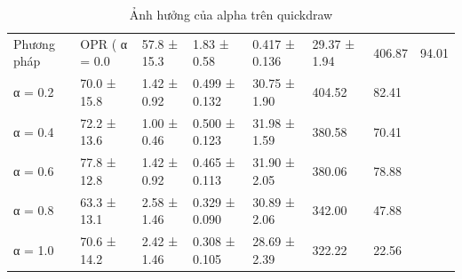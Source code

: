 \begin{table}
\caption{Ảnh hưởng của alpha trên quickdraw}
\begin{tabular}{lllllll}
\toprule
Phương pháp & OPR (%
\midrule
α = 0.0 & 57.8 ± 15.3 & 1.83 ± 0.58 & 0.417 ± 0.136 & 29.37 ± 1.94 & 406.87 & 94.01 \\
α = 0.2 & 70.0 ± 15.8 & 1.42 ± 0.92 & 0.499 ± 0.132 & 30.75 ± 1.90 & 404.52 & 82.41 \\
α = 0.4 & 72.2 ± 13.6 & 1.00 ± 0.46 & 0.500 ± 0.123 & 31.98 ± 1.59 & 380.58 & 70.41 \\
α = 0.6 & 77.8 ± 12.8 & 1.42 ± 0.92 & 0.465 ± 0.113 & 31.90 ± 2.05 & 380.06 & 78.88 \\
α = 0.8 & 63.3 ± 13.1 & 2.58 ± 1.46 & 0.329 ± 0.090 & 30.89 ± 2.06 & 342.00 & 47.88 \\
α = 1.0 & 70.6 ± 14.2 & 2.42 ± 1.46 & 0.308 ± 0.105 & 28.69 ± 2.39 & 322.22 & 22.56 \\
\bottomrule
\end{tabular}
\end{table}
